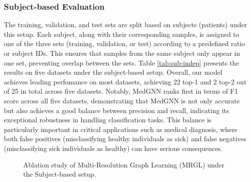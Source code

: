 
\vspace{-1mm}
\subsubsection{Subject-based Evaluation} The training, validation, and test sets are split based on subjects (patients) under this setup. Each subject, along with their corresponding samples, is assigned to one of the three sets (training, validation, or test) according to a predefined ratio or subject IDs. This ensures that samples from the same subject only appear in one set, preventing overlap between the sets.
Table \ref{tab:sub-indep} presents the results on five datasets under the subject-based setup. Overall, our model achieves leading perfomance on most datasets, achieving 22 top-1 and 2 top-2 out of 25 in total across five datasets. 
Notably, MedGNN ranks first in terms of F1 score across all five datasets, demonstrating that MedGNN is not only accurate but also achieves a good balance between precision and recall, indicating its exceptional robustness in handling classification tasks.
This balance is particularly important in critical applications such as medical diagnosis, where both false positives (misclassifying healthy individuals as sick) and false negatives (misclassifying sick individuals as healthy) can have serious consequences.

\begin{figure}[!t]
    \vspace{-2mm}
    \centering
    \vspace{-5mm}
    \caption{Ablation study of Multi-Resolution Graph Learning (MRGL) under the Subject-based setup.}
    \label{fig:abl_GNN}
    \vspace{-5mm}
\end{figure}


